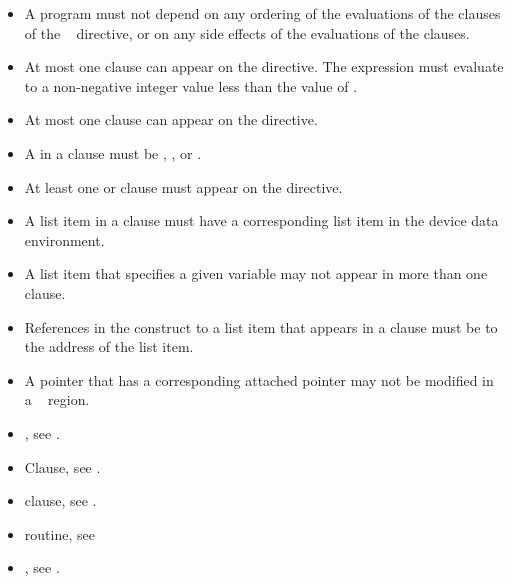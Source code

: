 \restrictions
\begin{itemize}
    \item A program must not depend on any ordering of the evaluations of the clauses of the
    ~ directive, or on any side effects of the evaluations of the clauses.

  \item At most one  clause can appear on the directive. The  expression
    must evaluate to a non-negative integer value less than the value
    of .

  \item At most one  clause can appear on the directive.
  \item A  in a  clause must be , ,  or .
  \item At least one  or  clause must appear on the directive.


  \item A list item in a  clause must have a
    corresponding list item in the device data environment.

  \item A list item that specifies a given variable may not appear in more than
	  one  clause.

  \item References in the construct to a list item that appears in a
     clause must be to the address of the list item.

  \item A pointer that has a corresponding attached pointer may not be modified
  in a ~ region.  

\end{itemize}


\crossreferences
\begin{itemize}
\item {}, see 
. 

\item {} Clause, see .

\item {} clause, see 
.

\item {} routine, see 

\item {}, see
.

\end{itemize}










